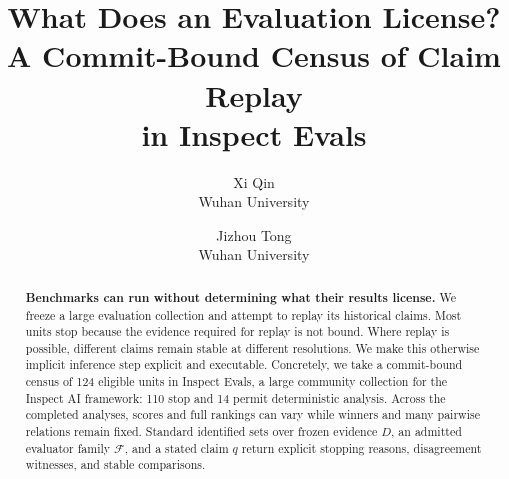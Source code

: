 \documentclass{article}
\title{What Does an Evaluation License?\\A Commit-Bound Census of Claim Replay\\in Inspect Evals}
\author{
Xi Qin\\
Wuhan University
\and
Jizhou Tong\\
Wuhan University
}
\date{}
\newcommand{\F}{\mathcal F}
\begin{document}
\maketitle
\suppressfloats[t]

\begin{abstract}
\textbf{Benchmarks can run without determining what their results license.}  We freeze a large evaluation collection and attempt to replay its historical claims.  Most units stop because the evidence required for replay is not bound.  Where replay is possible, different claims remain stable at different resolutions.  We make this otherwise implicit inference step explicit and executable.  Concretely, we take a commit-bound census of 124 eligible units in Inspect Evals, a large community collection for the Inspect AI framework: 110 stop and 14 permit deterministic analysis.  Across the completed analyses, scores and full rankings can vary while winners and many pairwise relations remain fixed.  Standard identified sets over frozen evidence \(D\), an admitted evaluator family \(\F\), and a stated claim \(q\) return explicit stopping reasons, disagreement witnesses, and stable comparisons.
\end{abstract}

\begin{center}
\end{center}

\fontsize{10}{11.6}\selectfont
\setlength{\parskip}{1.2pt plus .3pt minus .2pt}
\setlength{\textfloatsep}{7pt plus 2pt minus 1pt}
\setlength{\floatsep}{6pt plus 2pt minus 1pt}
\setlength{\intextsep}{6pt plus 2pt minus 1pt}
\setlength{\abovedisplayskip}{5pt plus 1pt minus 1pt}
\setlength{\belowdisplayskip}{5pt plus 1pt minus 1pt}
\end{document}
